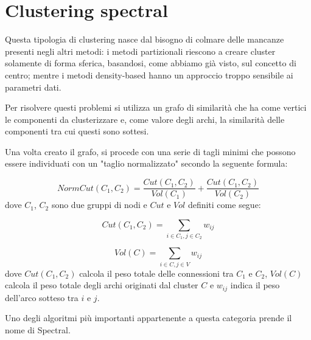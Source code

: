 \section{Clustering spectral}
	Questa tipologia di clustering nasce dal bisogno di colmare delle mancanze presenti negli altri metodi: i metodi partizionali riescono a creare cluster solamente di forma sferica, basandosi, come abbiamo già visto, sul concetto di centro; mentre i metodi density-based hanno un approccio troppo sensibile ai parametri dati.

	Per risolvere questi problemi si utilizza un grafo di similarità che ha come vertici le componenti da clusterizzare e, come valore degli archi, la similarità delle componenti tra cui questi sono sottesi.

	Una volta creato il grafo, si procede con una serie di tagli minimi che possono essere individuati con un "taglio normalizzato" secondo la seguente formula:

	\begin{equation*}
		NormCut(C_1, C_2) =  \frac{Cut(C_1, C_2)}{Vol(C_1)} + \frac{Cut(C_1, C_2)}{Vol(C_2)}
	\end{equation*}
	dove $C_1$, $C_2$ sono due gruppi di nodi e $Cut$ e $Vol$ definiti come segue:

	\begin{equation*}
		Cut(C_1, C_2) = \sum_{i \in C_1, j \in C_2} {w_{ij}}
	\end{equation*}

	\begin{equation*}
		Vol(C) = \sum_{i \in C, j \in V} {w_{ij}}
	\end{equation*}
	dove $Cut(C_1, C_2)$ calcola il peso totale delle connessioni tra $C_1$ e $C_2$, $Vol(C)$ calcola il peso totale degli archi originati dal cluster $C$ e $w_{ij}$ indica il peso dell'arco sotteso tra $i$ e $j$.

	Uno degli algoritmi più importanti appartenente a questa categoria prende il nome di Spectral\cite{spectral}.